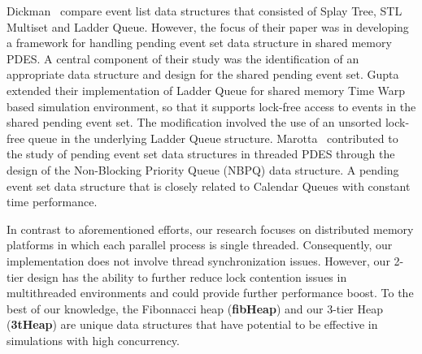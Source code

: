 Dickman~\cite{dickman-13} compare event list data structures that
consisted of Splay Tree, STL Multiset and Ladder Queue. However, the
focus of their paper was in developing a framework for handling
pending event set data structure in shared memory PDES. A central
component of their study was the identification of an appropriate data
structure and design for the shared pending event
set. Gupta~\cite{gupta-14} extended their implementation of Ladder
Queue for shared memory Time Warp based simulation environment, so
that it supports lock-free access to events in the shared pending
event set. The modification involved the use of an unsorted lock-free
queue in the underlying Ladder Queue
structure. Marotta~\cite{marotta-16} contributed to the study of
pending event set data structures in threaded PDES through the design
of the Non-Blocking Priority Queue (NBPQ) data structure. A pending
event set data structure that is closely related to Calendar Queues
with constant time performance.

In contrast to aforementioned efforts, our research focuses on
distributed memory platforms in which each parallel process is single
threaded. Consequently, our implementation does not involve thread
synchronization issues. However, our 2-tier design has the ability to
further reduce lock contention issues in multithreaded environments
and could provide further performance boost. To the best of our
knowledge, the Fibonnacci heap (\textbf{fibHeap}) and our 3-tier Heap
(\textbf{3tHeap}) are unique data structures that have potential to be
effective in simulations with high concurrency.

    

    

